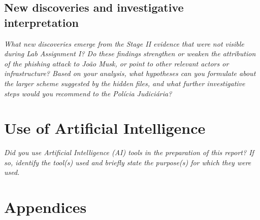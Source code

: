 \documentclass[11pt,a4paper,final,oneside]{article}
\begin{document}
\subsection{New discoveries and investigative interpretation}

\textit{What new discoveries emerge from the Stage II evidence that were not visible during Lab Assignment I? Do these findings strengthen or weaken the attribution of the phishing attack to João Musk, or point to other relevant actors or infrastructure? Based on your analysis, what hypotheses can you formulate about the larger scheme suggested by the hidden files, and what further investigative steps would you recommend to the Polícia Judiciária?}



\section{Use of Artificial Intelligence}
\label{sec:ai}

\textit{Did you use Artificial Intelligence (AI) tools in the preparation of this report? If so, identify the tool(s) used and briefly state the purpose(s) for which they were used.}



\section{Appendices}
\label{sec:appendices}

\end{document}
